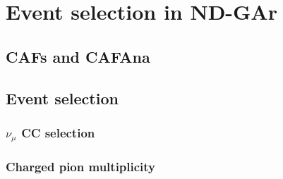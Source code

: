 \chapter{Event selection in ND-GAr}
\label{chapter:gar_selection}

\section{CAFs and CAFAna}

\section{Event selection}

\subsection[\texorpdfstring{$\nu_{\mu}$}{numu} CC selection]{\boldmath\texorpdfstring{$\nu_{\mu}$}{numu} CC selection}

\subsection{Charged pion multiplicity}
